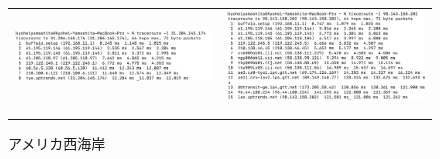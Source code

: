 \documentclass[dvipdfmx,autodetect-engine,titlepage]{jsarticle}
\begin{document}
\begin{figure}[htbp]
  \begin{tabular}{cc}
    \begin{minipage}[t]{0.45\hsize}
      \centering
      \includegraphics[keepaspectratio, scale=0.35]{SS5.png}
      \caption{東京}
    \end{minipage} &
    \begin{minipage}[t]{0.45\hsize}
      \centering
      \includegraphics[keepaspectratio, scale=0.35]{SS6.png}
      \caption{アメリカ西海岸}
    \end{minipage} \\ \\ \\
 

\end{tabular}
\end{figure}
\end{document}
